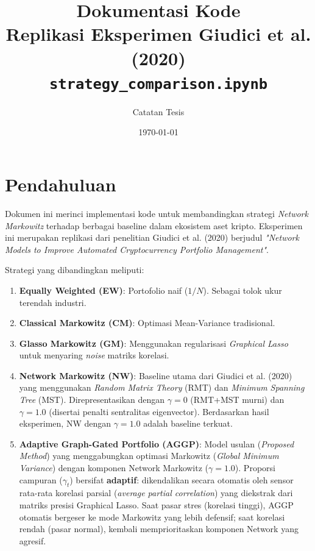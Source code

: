 \documentclass[12pt,a4paper]{article}
\title{\textbf{Dokumentasi Kode} \\ \large Replikasi Eksperimen Giudici et al. (2020) \\
\small \texttt{strategy\_comparison.ipynb}}
\author{Catatan Tesis}
\date{\today}
\begin{document}
\maketitle
\tableofcontents
\newpage

\section{Pendahuluan}
Dokumen ini merinci implementasi kode untuk membandingkan strategi \textit{Network Markowitz} terhadap berbagai baseline dalam ekosistem aset kripto. Eksperimen ini merupakan replikasi dari penelitian Giudici et al. (2020) berjudul \textit{"Network Models to Improve Automated Cryptocurrency Portfolio Management"}.

Strategi yang dibandingkan meliputi:
\begin{enumerate}
    \item \textbf{Equally Weighted (EW)}: Portofolio naif ($1/N$). Sebagai tolok ukur terendah industri.
    \item \textbf{Classical Markowitz (CM)}: Optimasi Mean-Variance tradisional.
    \item \textbf{Glasso Markowitz (GM)}: Menggunakan regularisasi \textit{Graphical Lasso} untuk menyaring \textit{noise} matriks korelasi.
    \item \textbf{Network Markowitz (NW)}: Baseline utama dari Giudici et al. (2020) yang menggunakan \textit{Random Matrix Theory} (RMT) dan \textit{Minimum Spanning Tree} (MST). Direpresentasikan dengan $\gamma=0$ (RMT+MST murni) dan $\gamma=1.0$ (disertai penalti sentralitas eigenvector). Berdasarkan hasil eksperimen, NW dengan $\gamma=1.0$ adalah baseline terkuat.
    \item \textbf{Adaptive Graph-Gated Portfolio (AGGP)}: Model usulan (\textit{Proposed Method}) yang menggabungkan optimasi Markowitz (\textit{Global Minimum Variance}) dengan komponen Network Markowitz ($\gamma=1.0$). Proporsi campuran ($\gamma_t$) bersifat \textbf{adaptif}: dikendalikan secara otomatis oleh sensor rata-rata korelasi parsial (\textit{average partial correlation}) yang diekstrak dari matriks presisi Graphical Lasso. Saat pasar stres (korelasi tinggi), AGGP otomatis bergeser ke mode Markowitz yang lebih defensif; saat korelasi rendah (pasar normal), kembali memprioritaskan komponen Network yang agresif.
\end{enumerate}
\end{document}
